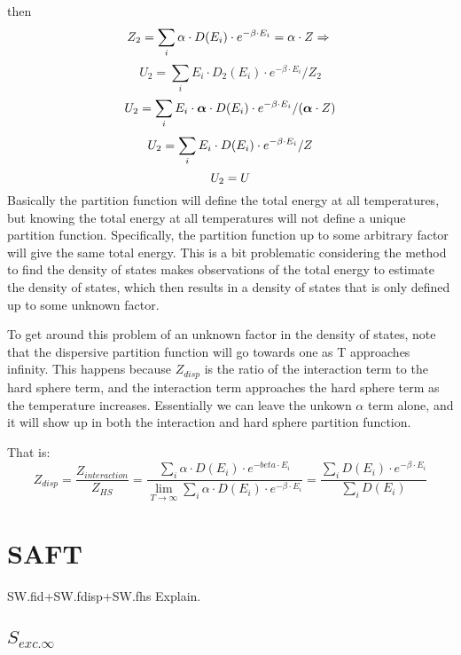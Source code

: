 then $$Z_2=\sum_i \alpha\cdot D(E_i)\cdot e^{-\beta\cdot E_i}=\alpha\cdot Z\Rightarrow\newline$$
$$U_2=\sum_i E_i\cdot D_2(E_i)\cdot e^{-\beta\cdot E_i}/Z_2$$
$$\newline U_2=\sum_i E_i\cdot \boldsymbol{\alpha}\cdot D(E_i)\cdot e^{-\beta\cdot E_i}/(\boldsymbol{\alpha}\cdot Z)$$
$$\newline U_2=\sum_i E_i\cdot D(E_i)\cdot e^{-\beta\cdot E_i}/Z$$
$$\newline U_2=U\newline$$
Basically the partition function will define the total energy at all temperatures, but knowing the total energy at all temperatures will not define a unique partition function. Specifically, the partition function up to some arbitrary factor will give the same total energy. This is a bit problematic considering the method to find the density of states makes observations of the total energy to estimate the density of states, which then results in a density of states that is only defined up to some unknown factor.

To get around this problem of an unknown factor in the density of states, note that the dispersive partition function will go towards one as T approaches infinity. This happens because $Z_{disp}$ is the ratio of the interaction term to the hard sphere term, and the interaction term approaches the hard sphere term as the temperature increases. Essentially we can leave the unkown $\alpha$ term alone, and it will show up in both the interaction and hard sphere partition function.

That is: $$Z_{disp}=\frac{Z_{interaction}}{Z_{HS}}=\frac{\sum_i \alpha\cdot D(E_i)\cdot e^{-beta\cdot E_i}}{\lim_{T\to\infty}\sum_i \alpha\cdot D(E_i)\cdot e^{-\beta\cdot E_i}}=\frac{\sum_i D(E_i)\cdot e^{-\beta\cdot E_i}}{\sum_i D(E_i)}$$

\section{SAFT}
SW.fid+SW.fdisp+SW.fhs Explain.

\subsection{$S_{exc.\infty}$}



